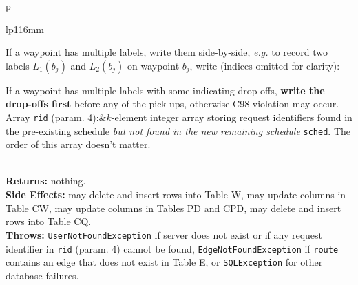 \documentclass{article}
\theoremstyle{definition}                   %
\begin{document}
\begin{tabular}{p{\textwidth}}
\begin{tabular}{lp{116mm}}

If a waypoint has multiple labels, write them side-by-side, \textit{e.g.}
to record two labels $L_1(b_j)$ and $L_2(b_j)$ on waypoint $b_j$, write
(indices omitted for clarity):


If a waypoint has multiple labels with some indicating drop-offs, \textbf{write
the drop-offs first} before any of the pick-ups, otherwise C98 violation may
occur.\\ Array {\tt{}rid} (param. 4):&$k$-element integer array storing request
identifiers found in the pre-existing schedule \emph{but not found in the new
remaining schedule} {\tt{}sched}. The order of this array doesn't matter.
\end{tabular}\\
\textbf{Returns:} nothing.\\
\textbf{Side Effects:} may delete and insert rows into Table W, may
update columns in Table CW, may update columns in Tables PD and CPD,
may delete and insert rows into Table CQ.\\
\textbf{Throws:} {\tt{}UserNotFoundException} if server does not exist or if
any request identifier in {\tt{}rid} (param. 4) cannot be found,
{\tt{}EdgeNotFoundException} if {\tt{}route} contains an edge that does not exist
in Table E, or {\tt{}SQLException} for other database failures.\\
\bottomrule
\end{tabular}
\nwenddocs{}\endmoddef{}
\end{document}
